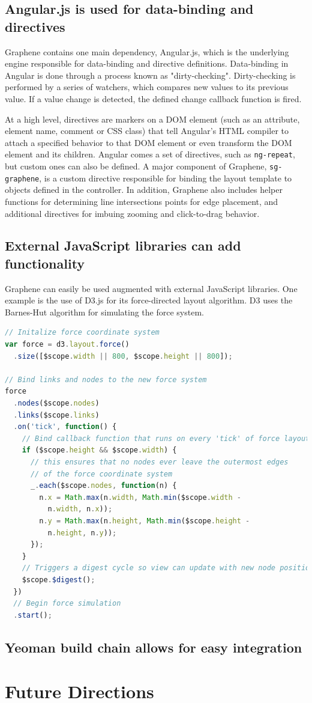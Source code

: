\subsection{Angular.js is used for data-binding and directives}
Graphene contains one main dependency, Angular.js, which is the underlying engine responsible for data-binding and directive definitions.
Data-binding in Angular is done through a process known as "dirty-checking".
Dirty-checking is performed by a series of watchers, which compares new values to its previous value. \autocite{google2014angularScope}
If a value change is detected, the defined change callback function is fired.

At a high level, directives are markers on a DOM element (such as an attribute, element name, comment or CSS class) that tell Angular's HTML compiler to attach a specified behavior to that DOM element or even transform the DOM element and its children. \autocite{google2014angularDirectives, google2014angulardirectives2}
Angular comes a set of directives, such as \texttt{ng-repeat}, but custom ones can also be defined.
A major component of Graphene, \texttt{sg-graphene}, is a custom directive responsible for binding the layout template to objects defined in the controller.
In addition, Graphene also includes helper functions for determining line intersections points for edge placement, and additional directives for imbuing zooming and click-to-drag behavior.

\subsection{External JavaScript libraries can add functionality}
Graphene can easily be used augmented with external JavaScript libraries.
One example is the use of D3.js \autocite{bostock2014d3} for its force-directed layout algorithm.
D3 uses the Barnes-Hut algorithm for simulating the force system. \autocite{bostock2011d3}

\begin{lstlisting}[language=JavaScript]
// Initalize force coordinate system
var force = d3.layout.force()
  .size([$scope.width || 800, $scope.height || 800]);

// Bind links and nodes to the new force system
force
  .nodes($scope.nodes)
  .links($scope.links)
  .on('tick', function() {
    // Bind callback function that runs on every 'tick' of force layout
    if ($scope.height && $scope.width) {
      // this ensures that no nodes ever leave the outermost edges
      // of the force coordinate system
      _.each($scope.nodes, function(n) {
        n.x = Math.max(n.width, Math.min($scope.width -
          n.width, n.x));
        n.y = Math.max(n.height, Math.min($scope.height -
          n.height, n.y));
      });
    }
    // Triggers a digest cycle so view can update with new node positions
    $scope.$digest();
  })
  // Begin force simulation
  .start();
\end{lstlisting}

\subsection{Yeoman build chain allows for easy integration}


\section{Future Directions}
\autocite{w3c2014components}
\autocite{w3c2014templating}
\autocite{polymer2014templating}
